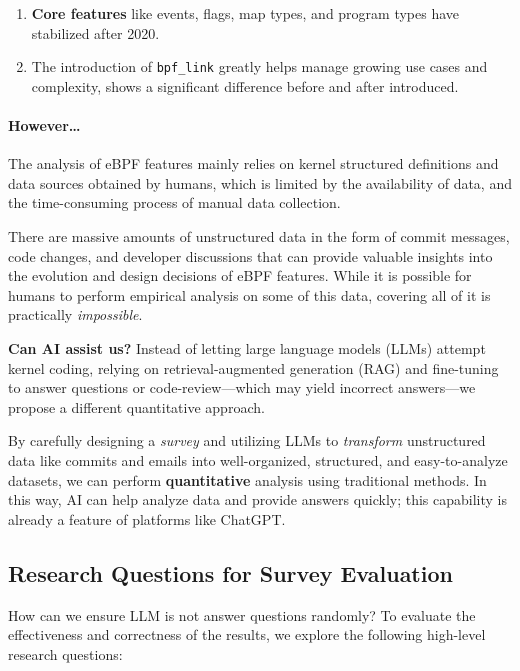 \begin{enumerate}
    \item \textbf{Core features} like events, flags, map types, and program types have stabilized after 2020.
    \item The introduction of \texttt{bpf\_link} greatly helps manage growing use cases and complexity, shows a significant difference before and after introduced.
\end{enumerate}

\paragraph{However\ldots}

The analysis of eBPF features mainly relies on kernel structured definitions and data sources obtained by humans, which is limited by the availability of data, and the time-consuming process of manual data collection.

There are massive amounts of unstructured data in the form of commit messages, code changes, and developer discussions that can provide valuable insights into the evolution and design decisions of eBPF features. While it is possible for humans to perform empirical analysis on some of this data, covering all of it is practically \emph{impossible}.

\textbf{Can AI assist us?} Instead of letting large language models (LLMs) attempt kernel coding, relying on retrieval-augmented generation (RAG) and fine-tuning to answer questions or code-review—which may yield incorrect answers—we propose a different quantitative approach.

By carefully designing a \emph{survey} and utilizing LLMs to \emph{transform} unstructured data like commits and emails into well-organized, structured, and easy-to-analyze datasets, we can perform \textbf{quantitative} analysis using traditional methods. In this way, AI can help analyze data and provide answers quickly; this capability is already a feature of platforms like ChatGPT.

\subsection{Research Questions for Survey Evaluation}

How can we ensure LLM is not answer questions randomly? To evaluate the effectiveness and correctness of the \emph{\sys} results, we explore the following high-level research questions:

